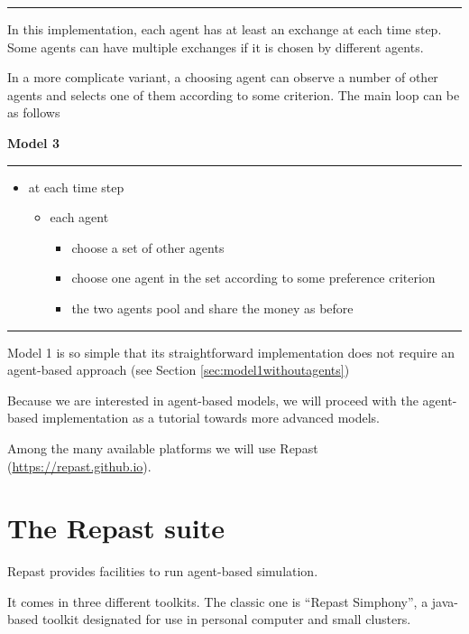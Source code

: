\documentclass{article}
\providecommand{\tightlist}{%
  \setlength{\itemsep}{0pt}\setlength{\parskip}{0pt}}
\begin{document}
\vskip-2mm
\hrule

\vskip4mm

In this implementation, each agent has at least an exchange at each time
step. Some agents can have multiple exchanges if it is chosen by
different agents.

In a more complicate variant, a choosing agent can observe a number of other agents and selects one of them according to some criterion. The main loop can be as follows

\vskip2mm
\noindent\textbf{Model 3}
\vskip1mm
\hrule

\begin{itemize}
\tightlist
\item
  at each time step

  \begin{itemize}
  \tightlist
  \item
    each agent

    \begin{itemize}
    \tightlist
    \item
      choose a set of other agents
    \item
      choose one agent in the set according to some preference criterion
    \item
      the two agents pool and share the money as before
    \end{itemize}
  \end{itemize}
\end{itemize}

\vskip-2mm
\hrule

\vskip4mm

Model 1 is so simple that its straightforward implementation does not require an agent-based approach (see Section \ref{sec:model1withoutagents})

Because we are interested in agent-based models, we will proceed with the agent-based implementation as a tutorial towards more advanced models.  

Among the many available platforms we will use Repast (\url{https://repast.github.io}).

\section{The Repast suite}

Repast provides facilities to run agent-based simulation.

It comes in three different toolkits. 
The classic one is ``Repast Simphony'', a java-based toolkit designated for use in personal computer and small clusters.  
\end{document}
